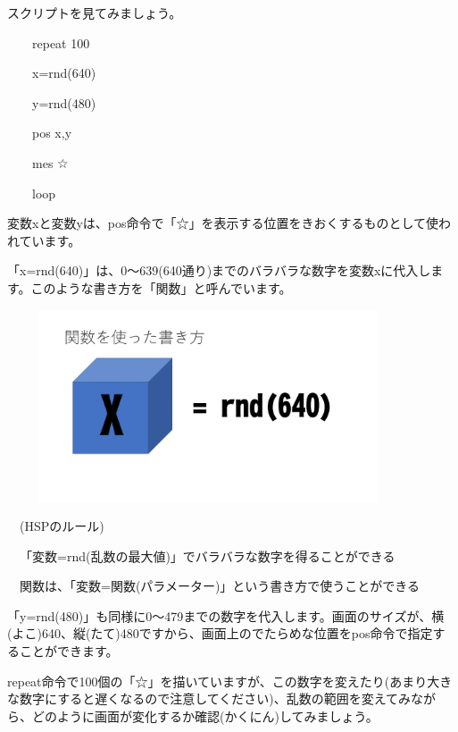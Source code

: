 \documentclass[a4paper,12pt]{jarticle}
\begin{document}
\bigskip
\bigskip
\bigskip

スクリプトを見てみましょう。

\bigskip

\ \ \ \ repeat 100

\ \ \ \ x=rnd(640)

\ \ \ \ y=rnd(480)

\ \ \ \ pos x,y

\ \ \ \ mes {\textquotedbl}☆{\textquotedbl}

\ \ \ \ loop

\bigskip

変数xと変数yは、pos命令で「☆」を表示する位置をきおくするものとして使われています。

「x=rnd(640)」は、0〜639(640通り)までのバラバラな数字を変数xに代入します。このような書き方を「関数」と呼んでいます。

\bigskip
\bigskip

\begin{minipage}{9.781cm}
\centering
{\upshape
\includegraphics[keepaspectratio,width=11.906cm,height=5.662cm]{text02-img/text02-img048.png}}
\end{minipage}

\bigskip
\bigskip
\bigskip

\ \ (HSPのルール)


\bigskip

\ \ 「変数=rnd(乱数の最大値)」でバラバラな数字を得ることができる

\ \ 関数は、「変数=関数(パラメーター)」という書き方で使うことができる

\bigskip

「y=rnd(480)」も同様に0〜479までの数字を代入します。画面のサイズが、横(よこ)640、縦(たて)480ですから、画面上のでたらめな位置をpos命令で指定することができます。

repeat命令で100個の「☆」を描いていますが、この数字を変えたり(あまり大きな数字にすると遅くなるので注意してください)、乱数の範囲を変えてみながら、どのように画面が変化するか確認(かくにん)してみましょう。
\end{document}
